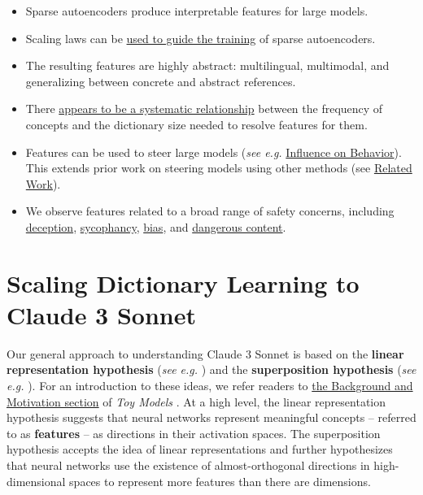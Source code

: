 \documentclass{article}
\let\oldsection\section
\renewcommand{\section}{\FloatBarrier\oldsection}
\begin{document}
\begin{itemize}
    \item Sparse autoencoders produce interpretable features for large models.
    \item Scaling laws can be \hyperref[sec:scaling-scaling-laws]{used to guide the training} of sparse autoencoders.
    \item The resulting features are highly abstract: multilingual, multimodal, and generalizing between concrete and abstract references.
    \item There \hyperref[sec:feature-survey-completeness]{appears to be a systematic relationship} between the frequency of concepts and the dictionary size needed to resolve features for them.
    \item Features can be used to steer large models (\textit{see e.g.} \hyperref[sec:assessing-tour-influence]{Influence on Behavior}). This extends prior work on steering models using other methods (see \hyperref[sec:related-work-steering]{Related Work}).
    \item We observe features related to a broad range of safety concerns, including \hyperref[sec:safety-relevant-deception]{deception}, \hyperref[sec:safety-relevant-sycophancy]{sycophancy}, \hyperref[sec:safety-relevant-bias]{bias}, and \hyperref[sec:safety-relevant-criminal]{dangerous content}.
\end{itemize}

\section{Scaling Dictionary Learning to Claude 3 Sonnet}\label{sec:scaling-to-sonnet}

Our general approach to understanding Claude 3 Sonnet is based on the \textbf{linear representation hypothesis} (\textit{see e.g.} \cite{mikolov2013linguistic}) and the \textbf{superposition hypothesis} (\textit{see e.g.} \cite{arora2018linear,goh2016decoding,elhage2022superposition}). For an introduction to these ideas, we refer readers to \href{https://transformer-circuits.pub/2022/toy_model/index.html\#motivation}{the Background and Motivation section} of \textit{Toy Models} \cite{elhage2022superposition}. At a high level, the linear representation hypothesis suggests that neural networks represent meaningful concepts -- referred to as \textbf{features} -- as directions in their activation spaces. The superposition hypothesis accepts the idea of linear representations and further hypothesizes that neural networks use the existence of almost-orthogonal directions in high-dimensional spaces to represent more features than there are dimensions.
\end{document}
